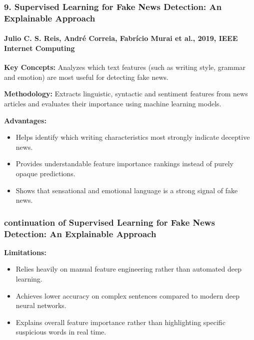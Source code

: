 \documentclass{beamer}
\begin{document}
\begin{frame}
\frametitle{9. Supervised Learning for Fake News Detection: An Explainable Approach}
\framesubtitle{Julio C. S. Reis, André Correia, Fabrício Murai et al., 2019, IEEE Internet Computing}
\small{
\textbf{Key Concepts:} Analyzes which text features (such as writing style, grammar and emotion) are most useful for detecting fake news. \par\vspace{0.15cm}
\textbf{Methodology:} Extracts linguistic, syntactic and sentiment features from news articles and evaluates their importance using machine learning models. \par\vspace{0.15cm}
\textbf{Advantages:}
\begin{itemize}
    \item Helps identify which writing characteristics most strongly indicate deceptive news.
    \item Provides understandable feature importance rankings instead of purely opaque predictions.
    \item Shows that sensational and emotional language is a strong signal of fake news.
\end{itemize}
}
\end{frame}

\begin{frame}
\frametitle{continuation of Supervised Learning for Fake News Detection: An Explainable Approach}
\large{
\textbf{Limitations:}
\begin{itemize}
    \item Relies heavily on manual feature engineering rather than automated deep learning.
    \item Achieves lower accuracy on complex sentences compared to modern deep neural networks.
    \item Explains overall feature importance rather than highlighting specific suspicious words in real time.
\end{itemize}
}
\end{frame}
\end{document}
